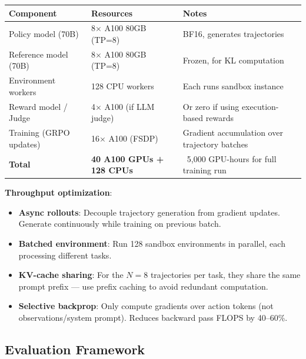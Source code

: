 \begin{tabular}{@{}lp{5cm}p{8cm}@{}}
\toprule
\textbf{Component} & \textbf{Resources} & \textbf{Notes} \\
\midrule
Policy model (70B) & 8$\times$ A100 80GB (TP=8) & BF16, generates trajectories \\
Reference model (70B) & 8$\times$ A100 80GB (TP=8) & Frozen, for KL computation \\
Environment workers & 128 CPU workers & Each runs sandbox instance \\
Reward model / Judge & 4$\times$ A100 (if LLM judge) & Or zero if using execution-based rewards \\
Training (GRPO updates) & 16$\times$ A100 (FSDP) & Gradient accumulation over trajectory batches \\
\textbf{Total} & \textbf{40 A100 GPUs + 128 CPUs} & ~5,000 GPU-hours for full training run \\
\bottomrule
\end{tabular}

\textbf{Throughput optimization}:

\begin{itemize}
  \item \textbf{Async rollouts}: Decouple trajectory generation from gradient updates. Generate continuously while training on previous batch.
  \item \textbf{Batched environment}: Run 128 sandbox environments in parallel, each processing different tasks.
  \item \textbf{KV-cache sharing}: For the $N=8$ trajectories per task, they share the same prompt prefix --- use prefix caching to avoid redundant computation.
  \item \textbf{Selective backprop}: Only compute gradients over action tokens (not observations/system prompt). Reduces backward pass FLOPS by 40--60\%.
\end{itemize}

\subsection{Evaluation Framework}
\label{evaluation-framework}

